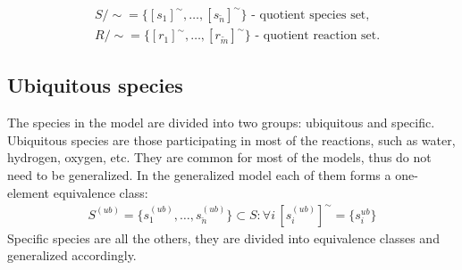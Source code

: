 \documentclass[10pt]{bmc_article}
\newenvironment{bmcformat}{\baselineskip20pt\sloppy\setboolean{publ}{false}}{\baselineskip20pt\sloppy}
\begin{document}
\begin{bmcformat}
\begin{align*}
&S/\sim = \{[s_1]^{\sim}, \ldots, [s_{\tilde{n}}]^{\sim}\}\text{ - quotient species set},\\
&R/\sim = \{[r_1]^{\sim}, \ldots, [r_{\tilde{m}}]^{\sim}\}\text{ - quotient reaction set}.
\end{align*}

\subsection*{Ubiquitous species}
The species in the model are divided into two groups: ubiquitous and specific. Ubiquitous species are those participating in most of the reactions, such as water, hydrogen, oxygen, etc. They are common for most of the models, thus do not need to be generalized. In the generalized model each of them forms a one-element equivalence class:
\begin{align*}
S^{(ub)} = \{s^{(ub)}_1, \ldots, s^{(ub)}_{\breve{n}}\} \subset S: \forall i\,[s^{(ub)}_i]^{\sim} = \{s^{ub}_i\}
\end{align*}
 Specific species are all the others, they are divided into equivalence classes and generalized accordingly.  


\end{bmcformat}
\end{document}
